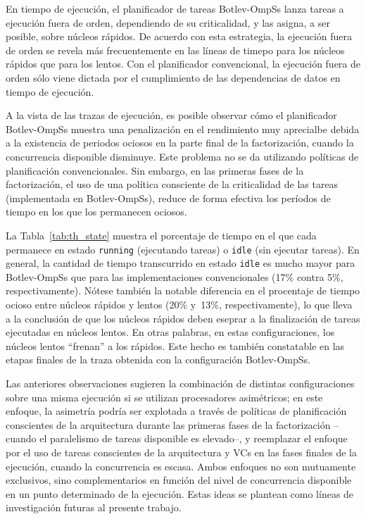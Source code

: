 En tiempo de ejecución, el planificador de tareas Botlev-OmpSs lanza tareas a ejecución fuera de orden, dependiendo de
su criticalidad, y las asigna, a ser posible, sobre núcleos rápidos. De acuerdo con esta estrategia, la ejecución fuera de
orden se revela más frecuentemente en las líneas de timepo para los núcleos rápidos que para los lentos. Con el planificador
convencional, la ejecución fuera de orden sólo viene dictada por el cumplimiento de las dependencias de datos en tiempo de ejecución.

A la vista de las trazas de ejecución, es posible observar cómo el planificador Botlev-OmpSs muestra una penalización
en el rendimiento muy aprecialbe debida a la existencia de periodos ociosos en la parte final de la factorización, cuando
la concurrencia disponible disminuye. Este problema no se da utilizando políticas de planificación convencionales. Sin embargo,
en las primeras fases de la factorización, el uso de una política consciente de la criticalidad de las tareas (implementada en 
Botlev-OmpSs), reduce de forma efectiva los períodos de tiempo en los que los \wts permanecen ociosos.

La Tabla~\ref{tab:th_state} muestra el porcentaje de tiempo en el que cada \wt permanece en estado 
{\tt running} (ejecutando tareas) o {\tt idle} (sin ejecutar tareas). En general, la cantidad de tiempo transcurrido en estado
{\tt idle} es mucho mayor para Botlev-OmpSs que para las implementaciones convencionales
(17\% contra 5\%, respectivamente). 
Nótese también la notable diferencia en el procentaje de tiempo ocioso entre núcleos rápidos y lentos
(20\% y~13\%, respectivamente), lo que lleva a la conclusión de que los núcleos rápidos deben eseprar 
a la finalización de tareas ejecutadas en núcleos lentos. En otras palabras, en estas configuraciones, los núcleos lentos ``frenan'' a los
rápidos. Este hecho es también constatable en las etapas finales de la traza obtenida con la configuración Botlev-OmpSs.

Las anteriores observaciones sugieren la combinación de distintas configuraciones sobre una misma ejecución si
se utilizan procesadores asimétricos; en este enfoque, la asimetría podría ser explotada a través de políticas de planificación
conscientes de la arquitectura durante las primeras fases de la factorización --cuando el paralelismo de tareas disponible es elevado--,
y reemplazar el enfoque por el uso de tareas conscientes de la arquitectura y VCs en las fases finales de la ejecución, cuando la
concurrencia es escasa. Ambos enfoques no son mutuamente exclusivos, sino complementarios en función del nivel de concurrencia disponible
en un punto determinado de la ejecución. Estas ideas se plantean como líneas de investigación futuras al presente trabajo.

